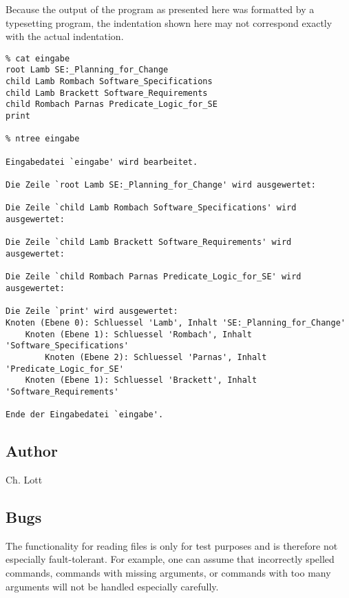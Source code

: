Because the output of the program as presented here was formatted by a
typesetting program, the indentation shown here may not correspond
exactly with the actual indentation.

{\small
\begin{verbatim}
% cat eingabe
root Lamb SE:_Planning_for_Change
child Lamb Rombach Software_Specifications
child Lamb Brackett Software_Requirements
child Rombach Parnas Predicate_Logic_for_SE
print

% ntree eingabe

Eingabedatei `eingabe' wird bearbeitet.

Die Zeile `root Lamb SE:_Planning_for_Change' wird ausgewertet:

Die Zeile `child Lamb Rombach Software_Specifications' wird ausgewertet:

Die Zeile `child Lamb Brackett Software_Requirements' wird ausgewertet:

Die Zeile `child Rombach Parnas Predicate_Logic_for_SE' wird ausgewertet:

Die Zeile `print' wird ausgewertet:
Knoten (Ebene 0): Schluessel 'Lamb', Inhalt 'SE:_Planning_for_Change'
    Knoten (Ebene 1): Schluessel 'Rombach', Inhalt 'Software_Specifications'
        Knoten (Ebene 2): Schluessel 'Parnas', Inhalt 'Predicate_Logic_for_SE'
    Knoten (Ebene 1): Schluessel 'Brackett', Inhalt 'Software_Requirements'

Ende der Eingabedatei `eingabe'.
\end{verbatim}
}
\subsection*{Author}
Ch. Lott
\subsection*{Bugs}
The functionality for reading files is only for test purposes and is
therefore not especially fault-tolerant.  For example, one can assume
that incorrectly spelled commands, commands with missing arguments, or
commands with too many arguments will not be handled especially
carefully. 

